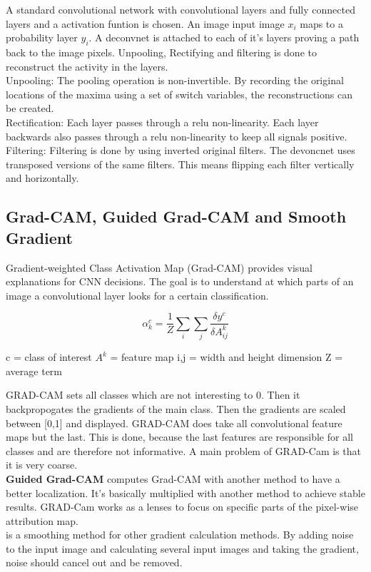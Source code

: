 A standard convolutional network with convolutional layers and fully connected layers and a activation funtion is chosen. An image input image $x_i$ maps to a probability layer $y_i$. 
A deconvnet \cite{Zeiler2011AdaptiveDN} is attached to each of it's layers proving a path back to the image pixels. Unpooling, Rectifying and filtering is done to reconstruct the activity in the layers.\\

Unpooling: The pooling operation is non-invertible. By recording the original locations of the maxima using a set of switch variables, the reconstructions can be created.\\

Rectification: Each layer passes  through a relu non-linearity. Each layer backwards also passes through a relu non-linearity to keep all signals positive.\\

Filtering: Filtering is done by using inverted original filters. The devoncnet uses transposed versions of the same filters. This means flipping each filter vertically and horizontally. 


\subsection{Grad-CAM, Guided Grad-CAM and Smooth Gradient}

Gradient-weighted Class Activation Map (Grad-CAM) provides visual explanations for CNN decisions. The goal is to understand at which parts of an image a convolutional layer looks for a certain classification. 

$$\alpha^c_k = \frac{1}{Z} \sum_{i}\sum_{j} \frac{\delta y^c}{\delta A^k_{ij}}$$

c = class of interest
$A^k$ = feature map
i,j = width and height dimension
Z = average term

GRAD-CAM sets all classes which are not interesting to 0. Then it backpropogates the gradients of the main class. Then the gradients are scaled between [0,1] and displayed. GRAD-CAM does take all convolutional feature maps but the last. This is done, because the last features are responsible for all classes and are therefore not informative. A main problem of GRAD-Cam is that it is very coarse.
\\
\textbf{Guided Grad-CAM} computes Grad-CAM with another method to have a better localization. It's basically multiplied with another method to achieve stable results. GRAD-Cam works as a lenses to focus on specific parts of the pixel-wise attribution map.
\\
 \cite{smilkov2017smoothgrad} is a smoothing method for other gradient calculation methods. By adding noise to the input image and calculating several input images and taking the gradient, noise should cancel out and be removed.


